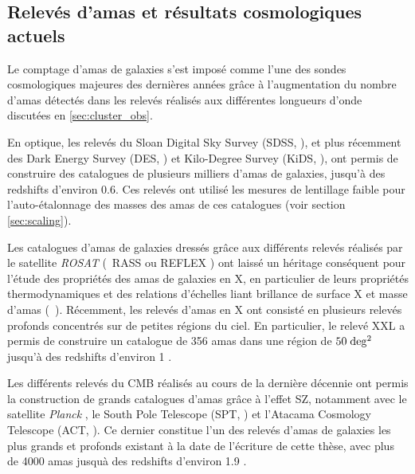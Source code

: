 \subsection{Relevés d'amas et résultats cosmologiques actuels}\label{sec:current_surveys}

Le comptage d'amas de galaxies s'est imposé comme l'une des sondes cosmologiques majeures des dernières années grâce à l'augmentation du nombre d'amas détectés dans les relevés réalisés aux différentes longueurs d'onde discutées en \ref{sec:cluster_obs}.

En optique, les relevés du Sloan Digital Sky Survey (SDSS, \cite{rykoff_redmapper_2014,costanzi_methods_2019}), et plus récemment des Dark Energy Survey (DES, \cite{des_collaboration_dark_2020}) et Kilo-Degree Survey (KiDS, \cite{lesci_amico_2020}), ont permis de construire des catalogues de plusieurs milliers d'amas de galaxies, jusqu'à des redshifts d'environ 0.6.
Ces relevés ont utilisé les mesures de lentillage faible pour l'auto-étalonnage des masses des amas de ces catalogues (voir section \ref{sec:scaling}).

Les catalogues d'amas de galaxies dressés grâce aux différents relevés réalisés par le satellite \textit{ROSAT} (\eg\ RASS \cite{bohringer_northern_2000} ou REFLEX \cite{bohringer_rosat-eso_2004}) ont laissé un héritage conséquent pour l'étude des propriétés des amas de galaxies en X, en particulier de leurs propriétés thermodynamiques et des relations d'échelles liant brillance de surface X et masse d'amas (\eg\ \cite{arnaud_universal_2010, pratt_galaxy_2009,pratt_gas_2010}).
Récemment, les relevés d'amas en X ont consisté en plusieurs relevés profonds concentrés sur de petites régions du ciel.
En particulier, le relevé XXL a permis de construire un catalogue de 356 amas dans une région de $50 \;{\rm deg^2}$ jusqu'à des redshifts d'environ 1 \cite{adami_xxl_2018}.

Les différents relevés du CMB réalisés au cours de la dernière décennie ont permis la construction de grands catalogues d'amas grâce à l'effet SZ, notamment avec le satellite \textit{Planck} \cite{planck_collaboration_planck_2016-1}, le South Pole Telescope (SPT, \cite{bleem_sptpol_2020}) et l'Atacama Cosmology Telescope (ACT, \cite{hilton_atacama_2021}).
Ce dernier constitue l'un des relevés d'amas de galaxies les plus grands et profonds existant à la date de l'écriture de cette thèse, avec plus de 4000 amas jusquà des redshifts d'environ 1.9 \cite{hilton_atacama_2021}.

